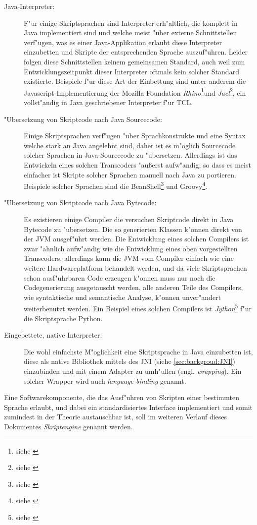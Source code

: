 \begin{description}
\item[Java-Interpreter:]
F"ur einige Skriptsprachen sind Interpreter erh"altlich, die komplett in Java implementiert sind und welche
meist "uber externe Schnittstellen verf"ugen, was es einer Java-Applikation erlaubt diese Interpreter einzubetten
und Skripte der entsprechenden Sprache auszuf"uhren. Leider folgen diese Schnittstellen keinem gemeinsamen
Standard, auch weil zum Entwicklungszeitpunkt dieser Interpreter oftmals kein solcher Standard existierte.
Beispiele f"ur diese Art der Einbettung sind unter anderem die Javascript-Implementierung
der Mozilla Foundation \emph{Rhino}\footnote{siehe \cite{RHINO}}und \emph{Jacl}\footnote{siehe \cite{JACL}}, 
ein vollst"andig in Java geschriebener Interpreter f"ur TCL. 
\item["Ubersetzung von Skriptcode nach Java Sourcecode:]
Einige Skriptsprachen verf"ugen "uber Sprachkonstrukte und eine Syntax welche stark an Java angelehnt sind,
daher ist es m"oglich Sourcecode solcher Sprachen in Java-Sourcecode zu "ubersetzen. Allerdings ist das
Entwickeln eines solchen Transcoders "au\ss erst aufw"andig, so dass es meist einfacher ist Skripte solcher
Sprachen manuell nach Java zu portieren. Beispiele solcher Sprachen sind die BeanShell\footnote{siehe \cite{BEANSHELL}} 
und Groovy\footnote{siehe \cite{GROOVY}}.
\item["Ubersetzung von Skriptcode nach Java Bytecode:]
Es existieren einige Compiler die versuchen Skriptcode direkt in Java Bytecode zu "ubersetzen. Die so
generierten Klassen k"onnen direkt von der JVM ausgef"uhrt werden. Die Entwicklung eines solchen
Compilers ist zwar "ahnlich aufw"andig wie die Entwicklung eines oben vorgestellten Transcoders, allerdings
kann die JVM vom Compiler einfach wie eine weitere Hardwareplatform behandelt werden, und da viele
Skriptsprachen schon ausf"uhrbaren Code erzeugen k"onnen muss nur noch die Codegenerierung ausgetauscht werden,
alle anderen Teile des Compilers, wie syntaktische und semantische Analyse, k"onnen unver"andert weiterbenutzt
werden. Ein Beispiel eines solchen Compilers ist \emph{Jython}\footnote{siehe \cite{JYTHON}} f"ur die Skriptsprache Python. 
\item[Eingebettete, native Interpreter:]
Die wohl einfachste M"oglichkeit eine Skriptsprache in Java einzubetten ist, diese als native Bibliothek mittels
des JNI (siehe \ref{sec:backgroud:JNI}) einzubinden und mit einem Adapter zu umh"ullen (engl. \emph{wrapping}). 
Ein solcher Wrapper wird auch \emph{language binding} genannt.
\end{description}
Eine Softwarekomponente, die das Ausf"uhren von Skripten einer bestimmten Sprache erlaubt, und dabei ein standardisiertes
Interface implementiert und somit zumindest in der Theorie austauschbar ist, soll im weiteren Verlauf
dieses Dokumentes \emph{Skriptengine} genannt werden.

